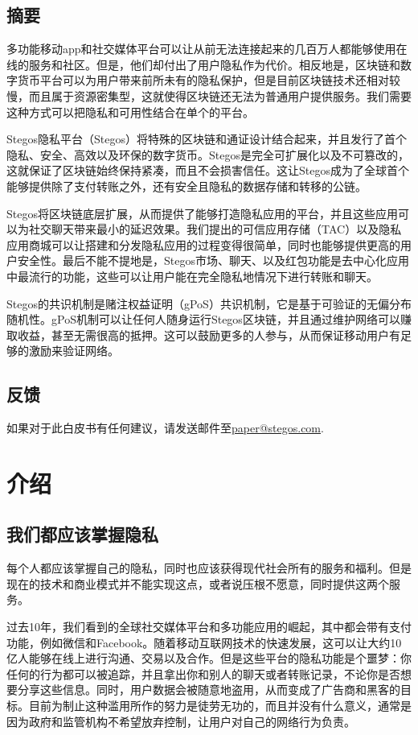 \documentclass[8pt,fleqn,openany]{book}
\begin{document}
\begin{CJK*}{UTF8}{gbsn}
\newpage

\tableofcontents\newpage

\section{摘要}
多功能移动app和社交媒体平台可以让从前无法连接起来的几百万人都能够使用在线的服务和社区。但是，他们却付出了用户隐私作为代价。相反地是，区块链和数字货币平台可以为用户带来前所未有的隐私保护，但是目前区块链技术还相对较慢，而且属于资源密集型，这就使得区块链还无法为普通用户提供服务。我们需要这种方式可以把隐私和可用性结合在单个的平台。

Stegos隐私平台（Stegos）将特殊的区块链和通证设计结合起来，并且发行了首个隐私、安全、高效以及环保的数字货币。Stegos是完全可扩展化以及不可篡改的，这就保证了区块链始终保持紧凑，而且不会损害信任。这让Stegos成为了全球首个能够提供除了支付转账之外，还有安全且隐私的数据存储和转移的公链。

Stegos将区块链底层扩展，从而提供了能够打造隐私应用的平台，并且这些应用可以为社交聊天带来最小的延迟效果。我们提出的可信应用存储（TAC）以及隐私应用商城可以让搭建和分发隐私应用的过程变得很简单，同时也能够提供更高的用户安全性。最后不能不提地是，Stegos市场、聊天、以及红包功能是去中心化应用中最流行的功能，这些可以让用户能在完全隐私地情况下进行转账和聊天。

Stegos的共识机制是赌注权益证明（gPoS）共识机制，它是基于可验证的无偏分布随机性。gPoS机制可以让任何人随身运行Stegos区块链，并且通过维护网络可以赚取收益，甚至无需很高的抵押。这可以鼓励更多的人参与，从而保证移动用户有足够的激励来验证网络。
\section{反馈}

如果对于此白皮书有任何建议，请发送邮件至\href{mailto:paper@stegos.com}{paper@stegos.com}.

\chapter{介绍}\label{chap:intro}

\section{我们都应该掌握隐私}
每个人都应该掌握自己的隐私，同时也应该获得现代社会所有的服务和福利。但是现在的技术和商业模式并不能实现这点，或者说压根不愿意，同时提供这两个服务。

过去10年，我们看到的全球社交媒体平台和多功能应用的崛起，其中都会带有支付功能，例如微信和Facebook。随着移动互联网技术的快速发展，这可以让大约10亿人能够在线上进行沟通、交易以及合作。但是这些平台的隐私功能是个噩梦：你任何的行为都可以被追踪，并且拿出你和别人的聊天或者转账记录，不论你是否想要分享这些信息。同时，用户数据会被随意地盗用，从而变成了广告商和黑客的目标。目前为制止这种滥用所作的努力是徒劳无功的，而且并没有什么意义，通常是因为政府和监管机构不希望放弃控制，让用户对自己的网络行为负责。


\end{CJK*}
\end{document}
